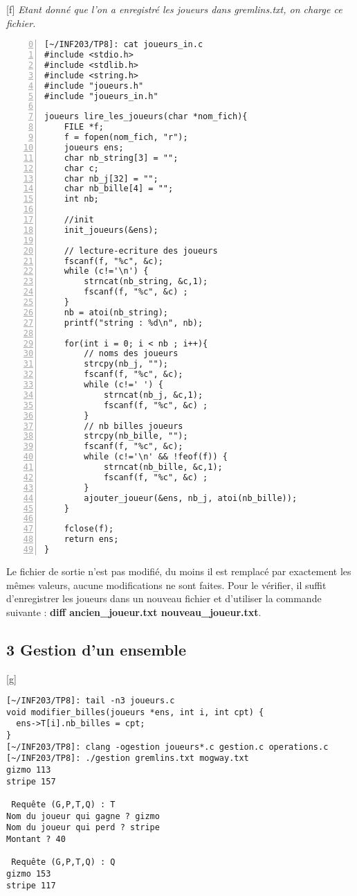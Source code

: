 \documentclass[12pt,a4paper,notitlepage,colorinlistoftodos]{article}
\begin{document}
[f]
\textit{Etant donné que l'on a enregistré les joueurs dans gremlins.txt, on charge ce fichier.}
\begin{lstlisting}[numbers=left, firstnumber = 0 ]
[~/INF203/TP8]: cat joueurs_in.c
#include <stdio.h>
#include <stdlib.h>
#include <string.h>
#include "joueurs.h"
#include "joueurs_in.h"

joueurs lire_les_joueurs(char *nom_fich){
    FILE *f;
    f = fopen(nom_fich, "r");
    joueurs ens;
    char nb_string[3] = "";
    char c;
    char nb_j[32] = "";
    char nb_bille[4] = "";
    int nb;

    //init
    init_joueurs(&ens); 

    // lecture-ecriture des joueurs
    fscanf(f, "%c", &c);
    while (c!='\n') {	
        strncat(nb_string, &c,1);
        fscanf(f, "%c", &c) ;   
    }
    nb = atoi(nb_string);
    printf("string : %d\n", nb);
    
    for(int i = 0; i < nb ; i++){
        // noms des joueurs
        strcpy(nb_j, "");
        fscanf(f, "%c", &c);
        while (c!=' ') {	
            strncat(nb_j, &c,1);
            fscanf(f, "%c", &c) ;   
        }
        // nb billes joueurs
        strcpy(nb_bille, "");
        fscanf(f, "%c", &c);
        while (c!='\n' && !feof(f)) {	
            strncat(nb_bille, &c,1);
            fscanf(f, "%c", &c) ;   
        }
        ajouter_joueur(&ens, nb_j, atoi(nb_bille));
    }
    
    fclose(f);
    return ens;
}
\end{lstlisting}
Le fichier de sortie n'est pas modifié, du moins il est remplacé par exactement les mêmes valeurs, aucune modifications ne sont faites.
Pour le vérifier, il suffit d'enregistrer les joueurs dans un nouveau fichier et d'utiliser la commande suivante : 
\textbf{diff ancien\_joueur.txt nouveau\_joueur.txt}.


\subsection*{3 Gestion d’un ensemble}

[g]
\begin{lstlisting}
[~/INF203/TP8]: tail -n3 joueurs.c 
void modifier_billes(joueurs *ens, int i, int cpt) {
  ens->T[i].nb_billes = cpt;
}
[~/INF203/TP8]: clang -ogestion joueurs*.c gestion.c operations.c 
[~/INF203/TP8]: ./gestion gremlins.txt mogway.txt 
gizmo 113
stripe 157

 Requête (G,P,T,Q) : T
Nom du joueur qui gagne ? gizmo
Nom du joueur qui perd ? stripe
Montant ? 40

 Requête (G,P,T,Q) : Q
gizmo 153
stripe 117
\end{lstlisting}
\end{document}
